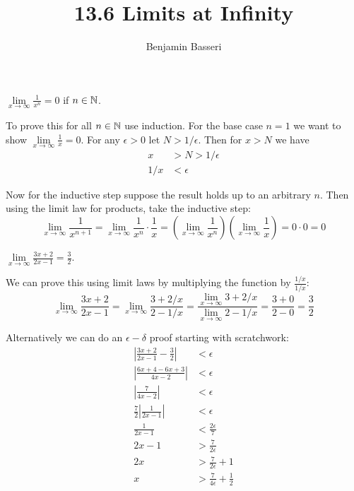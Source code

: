 \documentclass{article}
\title{13.6 Limits at Infinity}
\author{Benjamin Basseri}
\begin{document}
\maketitle
\begin{problem}
$\lim\limits_{x\to \infty} \frac{1}{x^n} = 0$ if $n \in \mathbb{N}$.
\end{problem}

To prove this for all $n\in\mathbb{N}$ use induction. For the base case $n=1$ we want to show $\lim\limits_{x\to\infty} \frac{1}{x} = 0$. For any $\epsilon > 0$ let $N > 1/\epsilon$. Then for $x > N$ we have
\begin{align*}
  x   & > N > 1/\epsilon \\
  1/x & < \epsilon
\end{align*}

Now for the inductive step suppose the result holds up to an arbitrary $n$. Then using the limit law for products, take the inductive step:
$$\lim_{x\to\infty} \frac{1}{x^{n+1}} = \lim_{x\to\infty} \frac{1}{x^n} \cdot \frac{1}{x} = \left(\lim_{x\to\infty} \frac{1}{x^n}\right)\left(\lim_{x \to \infty} \frac{1}{x}\right) = 0 \cdot 0 = 0$$

\begin{problem}
$\lim\limits_{x\to\infty} \frac{3x + 2}{2x - 1} = \frac{3}{2}$.
\end{problem}

We can prove this using limit laws by multiplying the function by $\frac{1/x}{1/x}$:
$$\lim_{x\to\infty} \frac{3x + 2}{2x - 1} = \lim_{x\to\infty} \frac{3 + 2/x}{2 - 1/x} = \frac{\lim_{x\to\infty} 3 + 2/x}{\lim_{x\to\infty} 2 - 1/x} = \frac{3 + 0}{2 - 0} = \frac{3}{2}$$

Alternatively we can do an $\epsilon-\delta$ proof starting with scratchwork:
\begin{align*}
  \left|\frac{3x + 2}{2x - 1} - \frac{3}{2}\right| & < \epsilon                          \\
  \left|\frac{6x + 4 - 6x + 3}{4x - 2}\right|      & < \epsilon                          \\
  \left|\frac{7}{4x - 2}\right|                    & < \epsilon                          \\
  \frac{7}{2}\left|\frac{1}{2x - 1}\right|         & < \epsilon                          \\
  \frac{1}{2x - 1}                                 & < \frac{2\epsilon}{7}               \\
  2x - 1                                           & > \frac{7}{2\epsilon}               \\
  2x                                               & > \frac{7}{2\epsilon}+1             \\
  x                                                & > \frac{7}{4\epsilon} + \frac{1}{2}
\end{align*}
\end{document}
